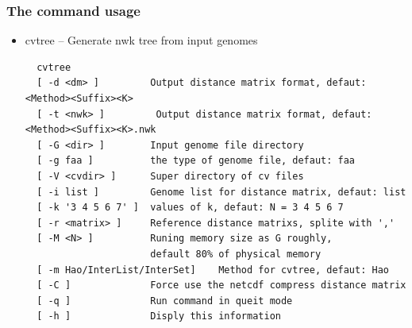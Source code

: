 \documentclass[a4paper,12pt]{article}
\begin{document}
\subsubsection{The command usage}
\begin{itemize}\itemsep 0pt
  \item cvtree -- Generate nwk tree from input genomes
\begin{verbatim}
  cvtree
  [ -d <dm> ]         Output distance matrix format, defaut: <Method><Suffix><K>
  [ -t <nwk> ]         Output distance matrix format, defaut: <Method><Suffix><K>.nwk
  [ -G <dir> ]        Input genome file directory
  [ -g faa ]          the type of genome file, defaut: faa
  [ -V <cvdir> ]      Super directory of cv files
  [ -i list ]         Genome list for distance matrix, defaut: list
  [ -k '3 4 5 6 7' ]  values of k, defaut: N = 3 4 5 6 7
  [ -r <matrix> ]     Reference distance matrixs, splite with ','
  [ -M <N> ]          Runing memory size as G roughly,
                      default 80% of physical memory
  [ -m Hao/InterList/InterSet]    Method for cvtree, defaut: Hao
  [ -C ]              Force use the netcdf compress distance matrix
  [ -q ]              Run command in queit mode
  [ -h ]              Disply this information
\end{verbatim}
\end{itemize}
\end{document}
